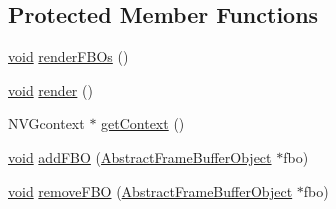 \subsection*{Protected Member Functions}
\begin{DoxyCompactItemize}
\item 
\mbox{\hyperlink{_thread_8h_af1e856da2e658414cb2456cb6f7ebc66}{void}} \mbox{\hyperlink{classnjli_1_1_world_h_u_d_a93c0a1a56854f78c78fc1f3bfb5d91e0}{render\+F\+B\+Os}} ()
\item 
\mbox{\hyperlink{_thread_8h_af1e856da2e658414cb2456cb6f7ebc66}{void}} \mbox{\hyperlink{classnjli_1_1_world_h_u_d_a71d1e7e224fd723fae0bb65cbdd235c9}{render}} ()
\item 
N\+V\+Gcontext $\ast$ \mbox{\hyperlink{classnjli_1_1_world_h_u_d_ac4de9e7e89d1d14b047e16f3fc3ba86a}{get\+Context}} ()
\item 
\mbox{\hyperlink{_thread_8h_af1e856da2e658414cb2456cb6f7ebc66}{void}} \mbox{\hyperlink{classnjli_1_1_world_h_u_d_af9a191868f90ef56bcfabf2b9367264c}{add\+F\+BO}} (\mbox{\hyperlink{classnjli_1_1_abstract_frame_buffer_object}{Abstract\+Frame\+Buffer\+Object}} $\ast$fbo)
\item 
\mbox{\hyperlink{_thread_8h_af1e856da2e658414cb2456cb6f7ebc66}{void}} \mbox{\hyperlink{classnjli_1_1_world_h_u_d_a4baeb3d5641693f60c61f5b982cb159b}{remove\+F\+BO}} (\mbox{\hyperlink{classnjli_1_1_abstract_frame_buffer_object}{Abstract\+Frame\+Buffer\+Object}} $\ast$fbo)
\end{DoxyCompactItemize}

